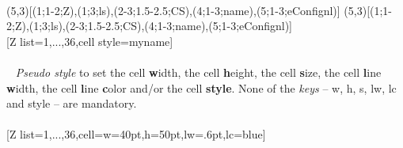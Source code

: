 \\ [5pt](5,3)[(1;1-2;Z),(1;3;ls),(2-3;1.5-2.5;CS),(4;1-3;name),(5;1-3;eConfignl)]%
(5,3)[(1;1-2;Z),(1;3;ls),(2-3;1.5-2.5;CS),(4;1-3;name),(5;1-3;eConfignl)]%
\\ [-4pt][Z list={1,...,36},cell style=myname]%
\\ [10pt]\makebox[\linewidth][c]{\scalebox{.6}{\pgfPT[Z list={1,...,36},cell style=myname]}}%
\\ [5pt]\pgfPTendoption%
\newpage\vspace{-34pt}\ %
\label{style_cell}%
%
{\textit{Pseudo style} to set the cell \textbf{w}idth, the cell \textbf{h}eight, the cell \textbf{s}ize, the cell \textbf{l}ine \textbf{w}idth, the cell \textbf{l}ine \textbf{c}olor and/or the cell \textbf{style}. None of the \textit{keys} -- w, h, s, lw, lc and style -- are mandatory.
\\ [3pt]%
}%
\\ [5pt][Z list={1,...,36},cell={w=40pt,h=50pt,lw=.6pt,lc=blue}]%
\\ [10pt]\makebox[\linewidth][c]{\scalebox{.6}{\pgfPT[Z list={1,...,36},cell={w=40pt,h=50pt,lw=.6pt,lc=blue}]}}%
\\ [5pt]\pgfPTendstyle%
\vfill%
\label{option_font}%
%
